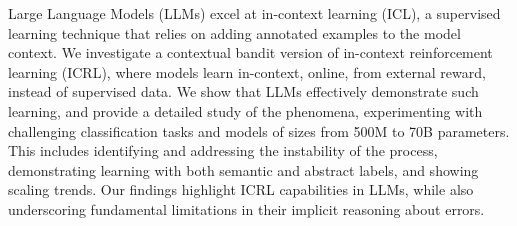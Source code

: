 Large Language Models (LLMs) excel at in-context learning (ICL), a supervised learning technique that relies on adding annotated examples to the model context. We investigate a contextual bandit version of in-context reinforcement learning (ICRL), where models learn in-context, online, from external reward, instead of supervised data. We show that LLMs effectively demonstrate such learning, and provide a detailed study of the phenomena, experimenting with challenging classification tasks and models of sizes from 500M to 70B parameters. This includes identifying and addressing the instability of the process, demonstrating learning with both semantic and abstract labels, and showing scaling trends. Our findings highlight ICRL capabilities in LLMs, while also underscoring fundamental limitations in their implicit reasoning about errors.

